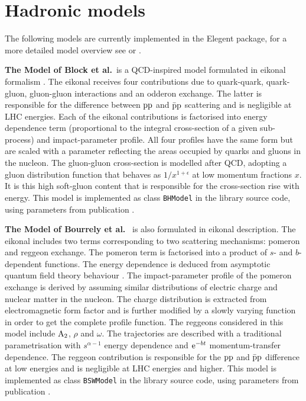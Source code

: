 \documentclass[preprint,12pt]{elsarticle}
\def\class#1{{\tt #1}}
\def\e{{\rm e}}
\begin{document}

\section{Hadronic models}\label{s:had mod}

The following models are currently implemented in the Elegent package, for a more detailed model overview see \cite[section 1.1]{jan_thesis} or \cite[section 4]{dremin13}.

{\bf The Model of Block et al.}~is a QCD-inspired model formulated in eikonal formalism \cite{bh99,block06}. The eikonal receives four contributions due to quark-quark, quark-gluon, gluon-gluon interactions and an odderon exchange. The latter is responsible for the difference between $\rm pp$ and $\rm \bar p p$ scattering and is negligible at LHC energies. Each of the eikonal contributions is factorised into energy dependence term (proportional to the integral cross-section of a given sub-process) and impact-parameter profile. All four profiles have the same form but are scaled with a parameter reflecting the areas occupied by quarks and gluons in the nucleon. The gluon-gluon cross-section is modelled after QCD, adopting a gluon distribution function that behaves as $1/x^{1+\epsilon}$ at low momentum fractions $x$. It is this high soft-gluon content that is responsible for the cross-section rise with energy. This model is implemented as class \class{BHModel} in the library source code, using parameters from publication \cite{block06}.


{\bf The Model of Bourrely et al.}~\cite{bsw79,bsw84,bsw03,bsw11} is also formulated in eikonal description. The eikonal includes two terms corresponding to two scattering mechanisms: pomeron and reggeon exchange. The pomeron term is factorised into a product of $s$- and $b$-dependent functions. The energy dependence is deduced from asymptotic quantum field theory behaviour \cite{wu70}. The impact-parameter profile of the pomeron exchange is derived by assuming similar distributions of electric charge and nuclear matter in the nucleon. The charge distribution is extracted from electromagnetic form factor and is further modified by a slowly varying function in order to get the complete profile function. The reggeons considered in this model include $\rm A_2$, $\rho$ and $\omega$. The trajectories are described with a traditional parametrisation with $s^{\alpha - 1}$ energy dependence and $\e^{-bt}$ momentum-transfer dependence. The reggeon contribution is responsible for the $\rm pp$ and $\rm \bar pp$ difference at low energies and is negligible at LHC energies and higher. This model is implemented as class \class{BSWModel} in the library source code, using parameters from publication \cite{bsw03}.
\end{document}
